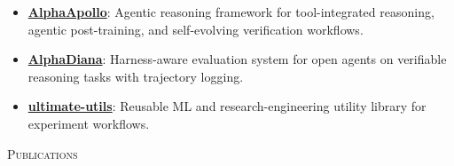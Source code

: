 \documentclass{article}
\newenvironment{changemargin}[2]{%
  \begin{list}{}{%
    \setlength{\topsep}{0pt}%
    \setlength{\leftmargin}{#1}%
    \setlength{\rightmargin}{#2}%
    \setlength{\listparindent}{\parindent}%
    \setlength{\itemindent}{\parindent}%
    \setlength{\parsep}{\parskip}%
  }%
  \item[]}{\end{list}
}
\newcommand{\lineover}{
	\begin{changemargin}{-0.05in}{-0.05in}
		\vspace*{-8pt}
		\hrulefill \\
		\vspace*{-2pt}
	\end{changemargin}
}
\newcommand{\header}[1]{
	\begin{changemargin}{-0.5in}{-0.5in}
		\scshape{#1}\\
  	\lineover
	\end{changemargin}
	\nopagebreak[4]    %
}
\newenvironment{body} {
		\vspace*{-16pt}
		\begin{changemargin}{-0.25in}{-0.5in}
	  }
		{\end{changemargin}\vspace{8pt plus 12pt}
	}
\begin{document}
\begin{body}
\begin{itemize}
		\item \textbf{\href{https://alphaapollo.org/}{AlphaApollo}}: Agentic reasoning framework for tool-integrated reasoning, agentic post-training, and self-evolving verification workflows.
		\item \textbf{\href{https://github.com/tmlr-group/AlphaDiana}{AlphaDiana}}: Harness-aware evaluation system for open agents on verifiable reasoning tasks with trajectory logging.
		\item \textbf{\href{https://github.com/brando90/ultimate-utils}{ultimate-utils}}: Reusable ML and research-engineering utility library for experiment workflows.
	\end{itemize}
\end{body}

\header{Publications}
\end{document}
